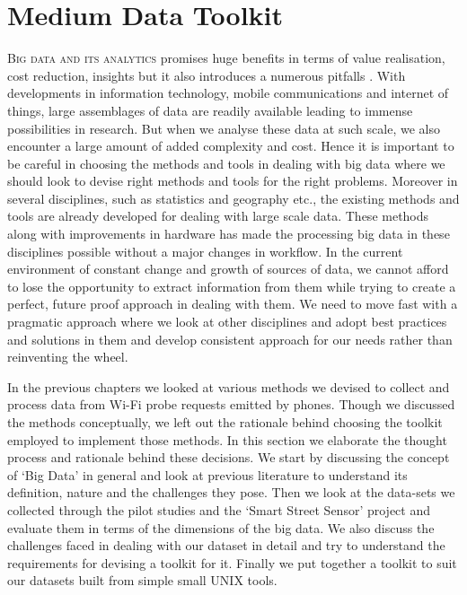 
\section{Medium Data Toolkit}

\textsc{Big data and its analytics} promises huge benefits in terms of value realisation, cost reduction, insights but it also introduces a numerous pitfalls \cite{gandomi2015beyond}.
With developments in information technology, mobile communications and internet of things, large assemblages of data are readily available leading to immense possibilities in research.
But when we analyse these data at such scale, we also encounter a large amount of added complexity and cost.
Hence it is important to be careful in choosing the methods and tools in dealing with big data where we should look to devise right methods and tools for the right problems.
Moreover in several disciplines, such as statistics and geography etc., the existing methods and tools are already developed for dealing with large scale data.
These methods along with improvements in hardware has made the processing big data in these disciplines possible without a major changes in workflow.
In the current environment of constant change and growth of sources of data, we cannot afford to lose the opportunity to extract information from them while trying to create a perfect, future proof approach in dealing with them.
We need to move fast with a pragmatic approach where we look at other disciplines and adopt best practices and solutions in them and develop consistent approach for our needs rather than reinventing the wheel.


In the previous chapters we looked at various methods we devised to collect and process data from Wi-Fi probe requests emitted by phones.
Though we discussed the methods conceptually, we left out the rationale behind choosing the toolkit employed to implement those methods.
In this section we elaborate the thought process and rationale behind these decisions.
We start by discussing the concept of `Big Data' in general and look at previous literature to understand its definition, nature and the challenges they pose.
Then we look at the data-sets we collected through the pilot studies and the `Smart Street Sensor' project and evaluate them in terms of the dimensions of the big data.
We also discuss the challenges faced in dealing with our dataset in detail and try to understand the requirements for devising a toolkit for it.
Finally we put together a toolkit to suit our datasets built from simple small UNIX tools. 

